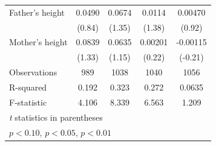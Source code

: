 \begin{table}[htbp]
\begin{tabular}{l*{4}{c}}
Father's height&      0.0490         &      0.0674         &      0.0114         &     0.00470         \\
            &      (0.84)         &      (1.35)         &      (1.38)         &      (0.92)         \\
Mother's height&      0.0839         &      0.0635         &     0.00201         &    -0.00115         \\
            &      (1.33)         &      (1.15)         &      (0.22)         &     (-0.21)         \\
\hline
Observations&         989         &        1038         &        1040         &        1056         \\
R-squared   &       0.192         &       0.323         &       0.272         &      0.0635         \\
F-statistic &       4.106         &       8.339         &       6.563         &       1.209         \\
\hline\hline
\multicolumn{5}{l}{\footnotesize \textit{t} statistics in parentheses}\\
\multicolumn{5}{l}{\footnotesize \sym{*} \(p<0.10\), \sym{**} \(p<0.05\), \sym{***} \(p<0.01\)}\\
\end{tabular}
\end{table}
